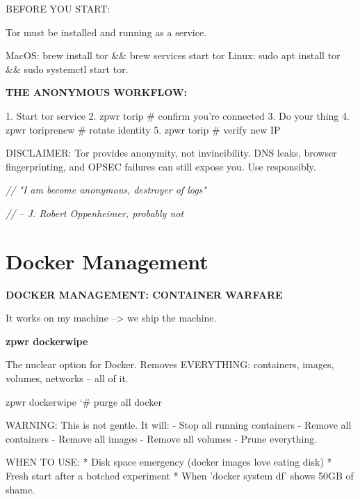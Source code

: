 \documentclass[11pt,a4paper,twoside]{book}
\begin{document}
BEFORE YOU START:

Tor must be installed and running as a service.

MacOS:   brew install tor \&\& brew services start tor Linux:   sudo apt install tor \&\& sudo systemctl start tor.


\vspace{12pt}
{\bfseries\color{neonyellow} THE ANONYMOUS WORKFLOW:}\vspace{4pt}

1. Start tor service 2. zpwr torip            \# confirm you're connected 3. Do your thing 4. zpwr toriprenew       \# rotate identity 5. zpwr torip            \# verify new IP

DISCLAIMER: Tor provides anonymity, not invincibility. DNS leaks, browser fingerprinting, and OPSEC failures can still expose you. Use responsibly.

{\small\itshape\color{dimtext} // "I am become anonymous, destroyer of logs"}

{\small\itshape\color{dimtext} //   -- J. Robert Oppenheimer, probably not}


\vspace{16pt}

\section{Docker Management}


\vspace{10pt}
{\large\bfseries\color{neoncyan} DOCKER MANAGEMENT: CONTAINER WARFARE}\vspace{6pt}

It works on my machine --> we ship the machine.


\vspace{12pt}
{\bfseries\color{neonyellow} zpwr dockerwipe}\vspace{4pt}

The nuclear option for Docker. Removes EVERYTHING: containers, images, volumes, networks -- all of it.

\begin{codebox}
\color{neongreen}zpwr dockerwipe             {\char`\#} purge all docker\\
\end{codebox}

WARNING: This is not gentle. It will: - Stop all running containers - Remove all containers - Remove all images - Remove all volumes - Prune everything.

WHEN TO USE: * Disk space emergency (docker images love eating disk) * Fresh start after a botched experiment * When 'docker system df' shows 50GB of shame.
\end{document}
